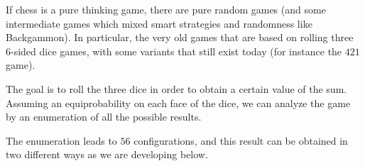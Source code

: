 If chess is a pure thinking game, there are pure random games
(and some intermediate games which mixed smart strategies and randomness like Backgammon).
In particular, the very old games that are based on rolling three 6-sided dice games,
with some variants that still exist today (for instance the $421$ game).

The goal is to roll the three dice in order to obtain a certain value of the sum.
Assuming an equiprobability on each face of the dice, we can analyze the game by an enumeration of all
the possible results. 

\bigskip

The enumeration leads to $56$ configurations, and this result can be obtained in two different ways
as we are developing below.
